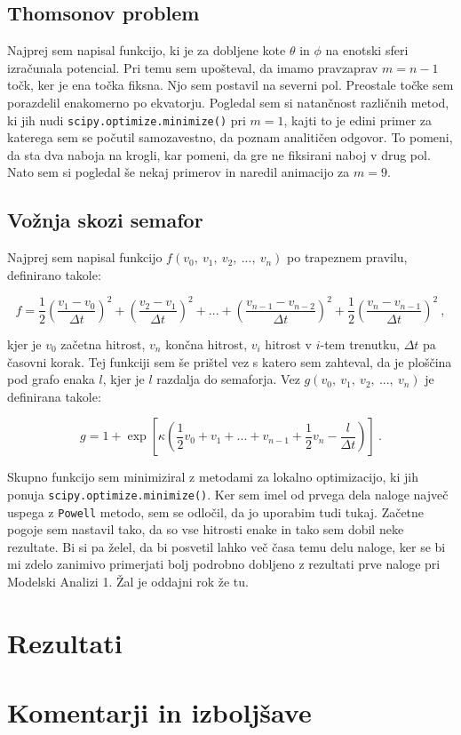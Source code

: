 \documentclass[a4paper]{article}
\begin{document}
\subsection{Thomsonov problem}
Najprej sem napisal funkcijo, ki je za dobljene kote $\theta$ in $\phi$ na enotski sferi izračunala
potencial. Pri temu sem upošteval, da imamo pravzaprav $m = n - 1$ točk, ker je ena točka fiksna. Njo
sem postavil na severni pol. Preostale točke sem porazdelil enakomerno po ekvatorju. Pogledal sem si
natančnost različnih metod, ki jih nudi \texttt{scipy.optimize.minimize()} pri $m=1$, kajti to je edini
primer za katerega sem se počutil samozavestno, da poznam analitičen odgovor. To pomeni, da sta dva naboja 
na krogli, kar pomeni, da gre ne fiksirani naboj v drug pol. Nato sem si pogledal še nekaj primerov 
in naredil animacijo za $m=9$. \\

\subsection{Vožnja skozi semafor}
Najprej sem napisal funkcijo $f(v_0,\>v_1,\>v_2,\>...,\>v_n)$ po trapeznem pravilu, definirano takole:

\begin{equation}
        f =
        \frac{1}{2} \left(\frac{v_1 - v_0}{\Delta t}\right)^2 + \left(\frac{v_2 - v_1}{\Delta t}\right)^2
        + ... + \left(\frac{v_{n-1} - v_{n-2}}{\Delta t}\right)^2 + \frac{1}{2} \left(\frac{v_n - v_{n-1}}{\Delta t}\right)^2\>,    
\end{equation}

kjer je $v_0$ začetna hitrost, $v_n$ končna hitrost, $v_i$ hitrost v $i$-tem trenutku, $\Delta t$ pa časovni korak.
Tej funkciji sem še prištel vez s katero sem zahteval, da je ploščina pod grafo enaka $l$, kjer je $l$ razdalja 
do semaforja. Vez $g(v_0,\>v_1,\>v_2,\>...,\>v_n)$ je definirana takole:

\begin{equation}
    g = 1 + \exp\left[\kappa\left(\frac{1}{2}v_0 + v_1 + ... + v_{n-1} + \frac{1}{2}v_n - 
    \frac{l}{\Delta t}\right)\right]\>.
\end{equation}

Skupno funkcijo sem minimiziral z metodami za lokalno optimizacijo, ki jih ponuja \texttt{scipy.optimize.minimize()}.
Ker sem imel od prvega dela naloge največ uspega z \texttt{Powell} metodo, sem se odločil, da jo uporabim tudi tukaj.
Začetne pogoje sem nastavil tako, da so vse hitrosti enake in tako sem dobil neke rezultate. Bi si pa želel, da bi 
posvetil lahko več časa temu delu naloge, ker se bi mi zdelo zanimivo primerjati bolj podrobno dobljeno z rezultati
prve naloge pri Modelski Analizi 1. Žal je oddajni rok že tu. \\

\section{Rezultati}


\section{Komentarji in izboljšave}

\newpage


\end{document}
